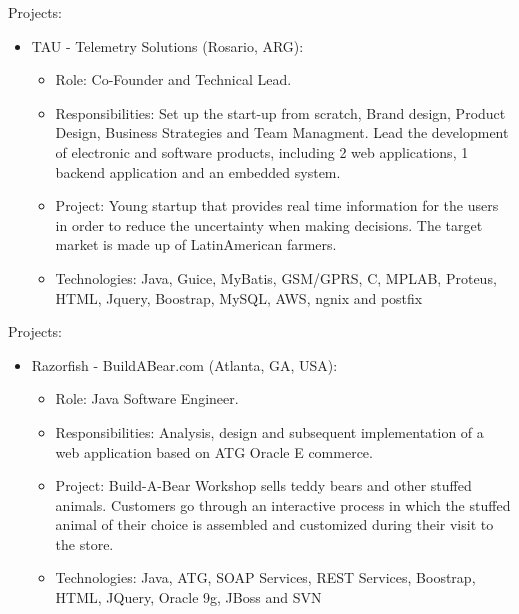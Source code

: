\documentclass[11pt,a4paper,sans]{moderncv}        %
\begin{document}
  {
    Projects:\\
    \begin{itemize}
      \item TAU - Telemetry Solutions (Rosario, ARG):
        \begin{itemize}
          \item Role: Co-Founder and Technical Lead. 
          \item Responsibilities: Set up the start-up from scratch, Brand design, Product Design, Business Strategies and Team Managment. Lead the development of electronic and software products, including 2 web applications, 1 backend application and an embedded system. 
          \item Project: Young startup that provides real time information for the users in order to reduce the uncertainty when making decisions. The target market is made up of LatinAmerican farmers.
          \item Technologies: Java, Guice, MyBatis, GSM/GPRS, C, MPLAB, Proteus, HTML, Jquery, Boostrap, MySQL, AWS, ngnix and postfix
        \end{itemize}
    \end{itemize}
  }

  {
    Projects:\\
    \begin{itemize}
      \item Razorfish - BuildABear.com (Atlanta, GA, USA):
        \begin{itemize}
          \item Role: Java Software Engineer. 
          \item Responsibilities: Analysis, design and subsequent implementation of a web application based on ATG Oracle E commerce.
          \item Project: Build-A-Bear Workshop sells teddy bears and other stuffed animals. Customers go through an interactive process in which the stuffed animal of their choice is assembled and customized during their visit to the store.
          \item Technologies: Java, ATG, SOAP Services, REST Services, Boostrap, HTML, JQuery, Oracle 9g, JBoss and SVN 
        \end{itemize}
    \end{itemize}
  }
\end{document}
